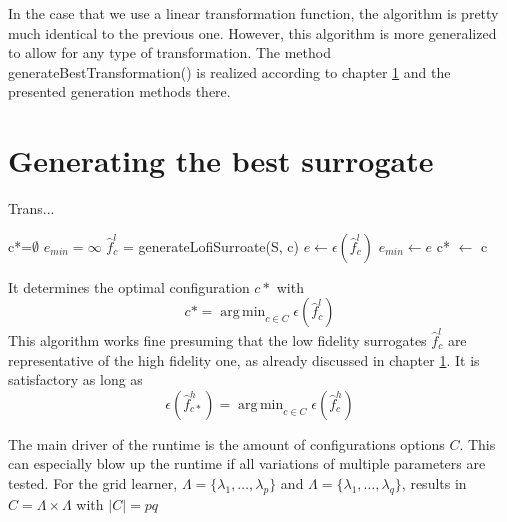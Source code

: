 \documentclass[
  a4paper,  %
  twoside,  %
  bibliography=totoc,
  headsepline,
  cleardoublepage=empty,
  parskip=half,
  draft=false
]{scrbook}
\DeclareMathOperator*{\argmin}{arg\,min}
\begin{document}
In the case that we use a linear transformation function, the algorithm is pretty much identical to the previous one.
However, this algorithm is more generalized to allow for any type of transformation.
The method generateBestTransformation() is realized according to chapter \ref{} and the presented generation methods there.

\section{Generating the best surrogate}

Trans...

\begin{algorithm}[H]
\normalsize
\begin{algorithmic}
    \State c*=$\emptyset$
    \State $e_{min}=\infty$
      \State $\hat{f}_c^l$ = generateLofiSurroate(S, c)
    	\State $e \gets \epsilon(\hat{f}_c^l)$
    	  \State $e_{min}\gets e$
    	\State c* $\gets$ c
    	\EndIf
    \EndFor
    \State {}
\EndFunction
\end{algorithmic}
\end{algorithm}

It determines the optimal configuration $c*$ with
\begin{equation}
c*=\argmin_{c \in C} \epsilon(\hat{f}_c^l)
\end{equation}
This algorithm works fine presuming that the low fidelity surrogates $\hat{f}_c^l$ are representative of the high fidelity one, as already discussed in chapter \ref{}.
It is satisfactory as long as 
\begin{equation}
\epsilon(\hat{f}_{c*}^h)=\argmin_{c \in C} \epsilon(\hat{f}_c^h)
\end{equation}

The main driver of the runtime is the amount of configurations options $C$.
This can especially blow up the runtime if all variations of multiple parameters are tested.
For the grid learner, $\Lambda=\{\lambda_1, \dots, \lambda_p\}$ and $\Lambda=\{\lambda_1, \dots, \lambda_q\}$, results in $C=\Lambda \times \Lambda$ with $|C|=pq$


\end{document}
